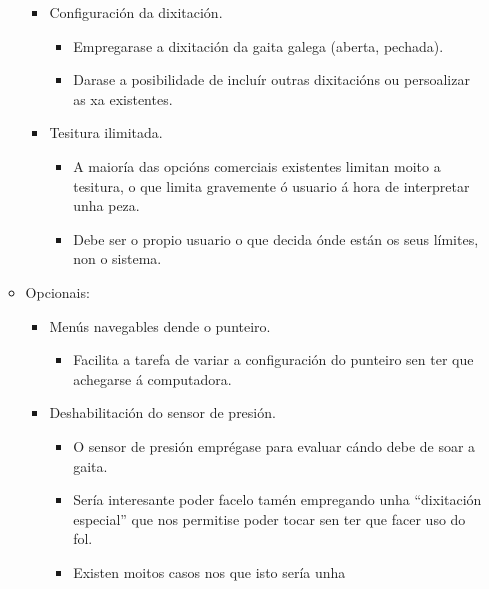 \begin{itemize}
\begin{itemize}
\begin{itemize}
                 \item Configuración da dixitación.
                       \begin{itemize}
                        \item Empregarase a dixitación da gaita galega (aberta,
                              pechada).
                        \item Darase a posibilidade de incluír outras
                              dixitacións ou persoalizar as xa existentes.
                       \end{itemize}
                 \item Tesitura ilimitada.
                       \begin{itemize}
                        \item A maioría das opcións comerciais existentes
                              limitan moito a tesitura, o que limita gravemente
                              ó usuario á hora de interpretar unha peza.
                        \item Debe ser o propio usuario o que decida ónde están
                              os seus límites, non o sistema.
                       \end{itemize}
                \end{itemize}
          \item Opcionais:
                \begin{itemize}
                 \item Menús navegables dende o punteiro.
                       \begin{itemize}
                        \item Facilita a tarefa de variar a configuración do
                              punteiro sen ter que achegarse á computadora.
                       \end{itemize}
                 \item Deshabilitación do sensor de presión.
                       \begin{itemize}
                        \item O sensor de presión emprégase para evaluar cándo
                              debe de soar a gaita.
                        \item Sería interesante poder facelo tamén empregando
                              unha ``dixitación especial'' que nos permitise
                              poder tocar sen ter que facer uso do fol.
                        \item Existen moitos casos nos que isto sería unha

\end{itemize}
\end{itemize}
\end{itemize}
\end{itemize}
